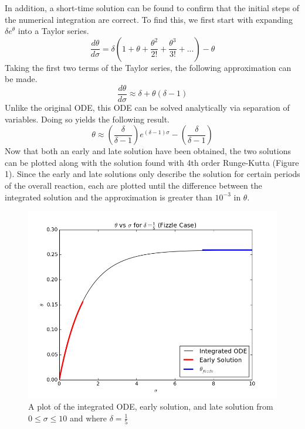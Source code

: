 \documentclass[12pt]{article}\pagestyle{myheadings}
\theoremstyle{plain}
\begin{document}
In addition, a short-time solution can be found to confirm that the initial steps of the numerical integration are correct. To find this, we first start with expanding $\delta e^{\theta}$ into a Taylor series. 
\[\frac{d\theta}{d\sigma} = \delta \left(1 + \theta + \frac{\theta^{2}}{2!} + \frac{\theta^{3}}{3!} + ...\right) - \theta\]
Taking the first two terms of the Taylor series, the following approximation can be made.
\[\frac{d\theta}{d\sigma}\approx \delta + \theta (\delta - 1)\] Unlike the original ODE, this ODE can be solved analytically via separation of variables. Doing so yields the following result. 
\begin{equation}\label{eq:appxEarly}
\theta \approx \left(\frac{\delta}{\delta - 1}\right) e^{(\delta - 1)\sigma} - \left(\frac{\delta}{\delta - 1}\right)
\end{equation}
Now that both an early and late solution have been obtained, the two solutions can be plotted along with the solution found with 4th order Runge-Kutta (Figure 1). Since the early and late solutions only describe the solution for certain periods of the overall reaction, each are plotted until the difference between the integrated solution and the approximation is greater than $10^{-3}$ in $\theta$.

\begin{figure}[h]
\centering
\includegraphics[scale=0.75]{Part1.png}
\caption{A plot of the integrated ODE, early solution, and late solution from $0 \le \sigma \le 10$ and where $\delta = \frac{1}{5}$}
\label{fig:Part1}
\end{figure}
\end{document}
